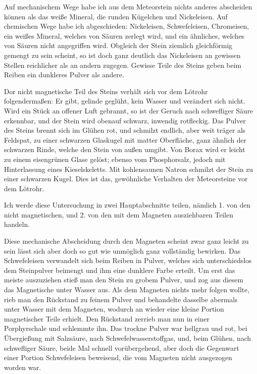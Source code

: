 \documentclass[a4paper, 11pt, oneside]{article}
\begin{document}
Auf mechanischem Wege habe ich aus dem Meteorstein nichts anderes abscheiden können als das weiße Mineral, die runden Kügelchen und Nickeleisen. Auf chemischen Wege habe ich abgeschieden: Nickeleisen, Schwefeleisen, Chromeisen, ein weißes Mineral, welches von Säuren zerlegt wird, und ein ähnliches, welches von Säuren nicht angegriffen wird. Obgleich der Stein ziemlich gleichförmig gemengt zu sein scheint, so ist doch ganz deutlich das Nickeleisen an gewissen Stellen reichlicher als an andern zugegen. Gewisse Teile des Steins geben beim Reiben ein dunkleres Pulver als andere.

Dor nicht magnetische Teil des Steins verhält sich vor dem Lötrohr folgendermaßen: Er gibt, gelinde geglüht, kein Wasser und verändert sich nicht. Wird ein Stück an offener Luft gebrannt, so ist der Geruch nach schwefliger Säure erkennbar, und der Stein wird obenauf schwarz, inwendig rotfleckig. Das Pulver des Steins brennt sich im Glühen rot, und schmilzt endlich, aber weit träger als Feldspat, zu einer schwarzen Glaskugel mit matter Oberfläche, ganz ähnlich der schwarzen Rinde, welche den Stein von außen umgibt. Von Borax wird er leicht zu einem eisengrünen Glase gelöst; ebenso vom Phosphorsalz, jedoch mit Hinterlassung eines Kieselskeletts. Mit kohlensaunen Natron schmilzt der Stein zu einer schwarzen Kugel. Dies ist das, gewöhnliche Verhalten der Meteorsteine vor dem Lötrohr.

Ich werde diese Untersuchung in zwei Hauptabschnitte teilen, nämlich 1. von den nicht magnetischen, und 2. von den mit dem Magneten ausziehbaren Teilen handeln.

Diese mechanische Abscheidung durch den Magneten scheint zwar ganz leicht zu sein lässt sich aber doch so gut wie unmöglich ganz vollständig bewirken. Das Schwefeleisen verwandelt sich beim Reiben in Pulver, welches sich unterschiedslos dem Steinpulver beimengt und ihm eine dunklere Farbe erteilt. Um erst das meiste auszuziehen stieß man den Stein zu grobem Pulver, und zog aus diesem das Magnetische unter Wasser aus. Als dem Magneten nichts mehr folgen wollte, rieb man den Rückstand zu feinem Pulver und behandelte dasselbe abermals unter Wasser mit dem Magneten, wodurch an wieder eine kleine Portion magnetischer Teile erhielt. Den Rückstand zerrieb man nun in einer Porphyrschale und schlemmte ihn. Das trockne Pulver war hellgrau und rot, bei Übergießung mit Salzsäure, nach Schwefelwasserstoffgas, und, beim Glühen, nach schwefliger Säure, beide Mal schnell vorübergehend, aber doch die Gegenwart einer Portion Schwefeleisen beweisend, die vom Magneten nicht ausgezogen worden war.
\end{document}
